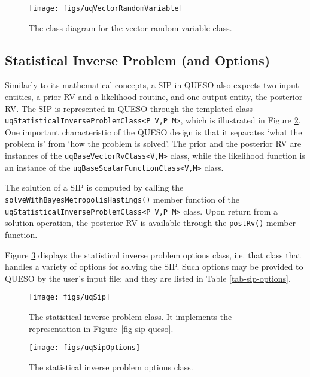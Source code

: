 \begin{figure}[htpb]
\centering
\texttt{[image: figs/uqVectorRandomVariable]}
\vspace{-8pt}
\caption{The class diagram for the vector random variable class.}
\label{fig-vector-rv-class}
\end{figure}



\subsection{Statistical Inverse Problem (and Options)}
Similarly to its mathematical concepts, a SIP in QUESO also expects two input entities, a prior RV and a likelihood routine, and one output entity, the posterior RV.
The SIP is represented in QUESO through the templated class \verb+uqStatisticalInverseProblemClass<P_V,P_M>+, which is illustrated in Figure \ref{fig-sip-class}.
One important characteristic of the QUESO design is that it  separates `what the problem is' from `how the problem is solved'.
The prior and the posterior RV are instances of the \verb+uqBaseVectorRvClass<V,M>+ class, while
the likelihood function is an instance of the \verb+uqBaseScalarFunctionClass<V,M>+ class.

The solution of a SIP is computed by calling the \verb+solveWithBayesMetropolisHastings()+ member function of the \verb+uqStatisticalInverseProblemClass<P_V,P_M>+ class.
Upon return from a solution operation, the posterior RV is available through the \verb+postRv()+ member function.


Figure \ref{fig-sip-options-class} displays the  statistical inverse problem options class, i.e. that class that handles a variety of options for solving the SIP. Such options may be provided to QUESO by the user's input file; and they are listed in Table \ref{tab-sip-options}.


\begin{figure}[htpb]
\centering
\texttt{[image: figs/uqSip]}
\vspace{-8pt}
\caption{The statistical inverse problem class. It implements the representation in Figure~\ref{fig-sip-queso}.}
\label{fig-sip-class}
\end{figure}

\begin{figure}[htpb]
\centering
\texttt{[image: figs/uqSipOptions]}
\vspace{-8pt}
\caption{The statistical inverse problem options class.}
\label{fig-sip-options-class}
\end{figure}


